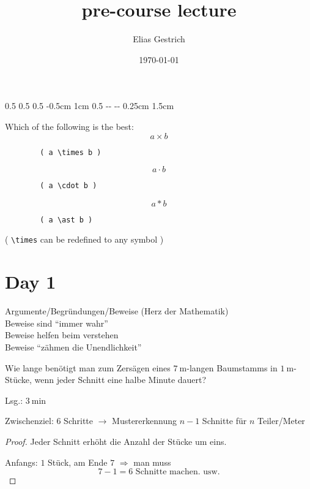 \documentclass[a4paper, parskip = true, fleqn, headsepline = true]{scrartcl}
\title{pre-course lecture}
\author{Elias Gestrich}
\date{\today}
\newlength{\hmargin}
\newlength{\lmargin}
\newlength{\rmargin}
\newlength{\fmargin}
\begin{document}
\setlength{\hoffset}		{0.5\lmargin-1in}
\setlength{\voffset}		{0.5\hmargin-1in}
\setlength{\oddsidemargin}	{0.5\lmargin}
\setlength{\topmargin}		{-0.5cm}
\setlength{\headheight}		{1cm}
\setlength{\headsep}		{0.5\hmargin-0.5cm}
%
\setlength{\textheight}		{\paperheight-\hmargin-\fmargin}
\setlength{\textwidth}		{\paperwidth-\lmargin-\rmargin}
\setlength{\linewidth}		{\textwidth}
%
\setlength{\marginparsep}	{0.25cm}
\setlength{\marginparwidth}	{1.5cm}

\maketitle
\thispagestyle{empty}



\begin{important}[TODO:]
	Which of the following is the best:
	\[ a \times b \]
	\begin{verbatim}
		( a \times b )
	\end{verbatim}
	\vspace{0.5cm}
	\[ a \cdot b \]
	\begin{verbatim}
		( a \cdot b )
	\end{verbatim}
	\vspace{0.5cm}
	\[ a \ast b \]
	\begin{verbatim}
		( a \ast b )
	\end{verbatim}
	\vspace{0.5cm}
	( \verb|\times| can be redefined to any symbol )
\end{important}

\section{Day 1}
Argumente/Begründungen/Beweise (Herz der Mathematik)\\
Beweise sind ``immer wahr''\\
Beweise helfen beim verstehen\\
Beweise ``zähmen die Unendlichkeit''\par

\begin{problem}
	Wie lange benötigt man zum Zersägen eines $\qty{7}{\meter}$-langen Baumstamms in $\qty{1}{\meter}$-Stücke, wenn jeder Schnitt eine halbe Minute dauert?\par
	Lsg.: $\qty{3}{\minute}$\par
	Zwischenziel: 6 Schritte $\rightarrow$ Mustererkennung $n-1$ Schnitte für $n$ Teiler/Meter\par
	\begin{proof}
		Jeder Schnitt erhöht die Anzahl der Stücke um eins.\par
		Anfangs: $1$ Stück, am Ende $7$ $\Rightarrow$ man muss \[7 - 1 = 6 \text{ Schnitte machen. usw.}\]
	\end{proof}
\end{problem}
\end{document}
